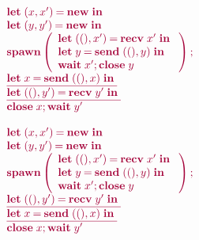 \documentclass[main.tex]{subfiles}
\begin{document}
\begin{center}
\begin{minipage}{0.5\linewidth}
\begin{example}
  \label{ex:cycle}
  \[\tm{%
    \begin{array}{l}
      \letpair{x}{x'}{\new}{}
      \\
      \letpair{y}{y'}{\new}{}
      \\
      \spawn\left(%
      \begin{array}{l}
        {\letpair{\unit}{x'}{\recv\;{x'}}{}}
        \\
        {\letbind{y}{\send\;{\pair{\unit}{y}}}{}}
        \\
        {\andthen{\wait\;{x'}}{\close\;{y}}}
      \end{array}%
      \right);
      \\
      \underline{\letbind{x}{\send\;{\pair{\unit}{x}}}{}}
      \\
      \underline{\letpair{\unit}{y'}{\recv\;{y'}}{}}
      \\
      {\andthen{\close\;{x}}{\wait\;{y'}}}
    \end{array}
  }\]
\end{example}
\end{minipage}%
\begin{minipage}{0.5\linewidth}
\begin{example}[Deadlock]
  \label{ex:deadlock}
  \[\tm{%
    \begin{array}{l}
      \letpair{x}{x'}{\new}{}
      \\
      \letpair{y}{y'}{\new}{}
      \\
      \spawn\left(%
      \begin{array}{l}
        {\letpair{\unit}{x'}{\recv\;{x'}}{}}
        \\
        {\letbind{y}{\send\;{\pair{\unit}{y}}}{}}
        \\
        {\andthen{\wait\;{x'}}{\close\;{y}}}
      \end{array}%
      \right);
      \\
      \underline{\letpair{\unit}{y'}{\recv\;{y'}}{}}
      \\
      \underline{\letbind{x}{\send\;{\pair{\unit}{x}}}{}}
      \\
      {\andthen{\close\;{x}}{\wait\;{y'}}}
    \end{array}
   }\]
\end{example}
\end{minipage}
\end{center}
\end{document}
